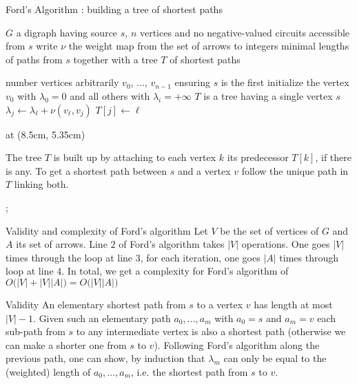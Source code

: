 \documentclass[32pt,aspectratio=169, handout]{beamer}
\begin{document}
\begin{frame}[t]{Ford's Algorithm : building a tree of shortest paths}
    \small{
      \begin{algorithmic}[1]
        \Require $G$ a digraph having source $s$, $n$ vertices and
        no negative-valued circuits accessible from $s$
        \Statex write $\nu$ the weight map from the set of arrows to integers
        \Ensure minimal lengths of paths from $s$ \alert{together with a tree $T$ of shortest paths}

       \State number vertices arbitrarily $v_0$, $\ldots$, $v_{n-1}$ ensuring $s$ is the first
       \State initialize the vertex $v_0$ with $\lambda_0 =0$ and all others with $\lambda_i = +\infty$
       \Statex \alert{$T$ is a tree having a single vertex $s$}
       \State $\lambda_j \gets \lambda_\ell + \nu(v_\ell, v_j)$
       \State \alert{$T[j] \gets \ell$}
       \EndIf
       \EndFor
       \EndFor

     \end{algorithmic}
     }
     \tikzoverlay[text width=5.5cm] at (8.5cm, 5.35cm) {
       \begin{tcolorbox}[
         enhanced,
         parbox = false,
         colback=mLightBrown!10!white,
         colframe=mLightBrown,
         arc=0mm,
         ]
         \small{The tree $T$ is built up by attaching to each vertex $k$ its
         predecessor $T[k]$, if there is any. To get a shortest path
         between $s$ and a vertex $v$ follow the unique path in $T$
         linking both.}
       \end{tcolorbox}%
     };
\end{frame}

\begin{frame}{Validity and complexity of Ford's algorithm}
  Let $V$ be the set of vertices of $G$ and $A$ its set of arrows.
  Line $2$ of Ford's algorithm takes $|V|$ operations. One goes $|V|$
  times through the loop at line $3$, for each iteration, one goes
  $|A|$ times through loop at line $4$. In total, we get a complexity
  for Ford's algorithm of
  $O\big(|V| + |V||A|\big) = O\big( |V||A|\big)$
  \begin{halfshyblock}{Validity}
    An elementary shortest path from $s$ to a vertex $v$ has length at
    most $|V|-1$. Given such an elementary path $a_0, \ldots, a_m$
    with $a_0=s$ and $a_m=v$ each sub-path from $s$ to any
    intermediate vertex is also a shortest path (otherwise we can make
    a shorter one from $s$ to $v$). Following Ford's algorithm along
    the previous path, one can show, by induction that $\lambda_m$ can
    only be equal to the (weighted) length of $a_0, \ldots, a_m$,
    i.e. the shortest path from $s$ to $v$.
  \end{halfshyblock}
\end{frame}
\end{document}
